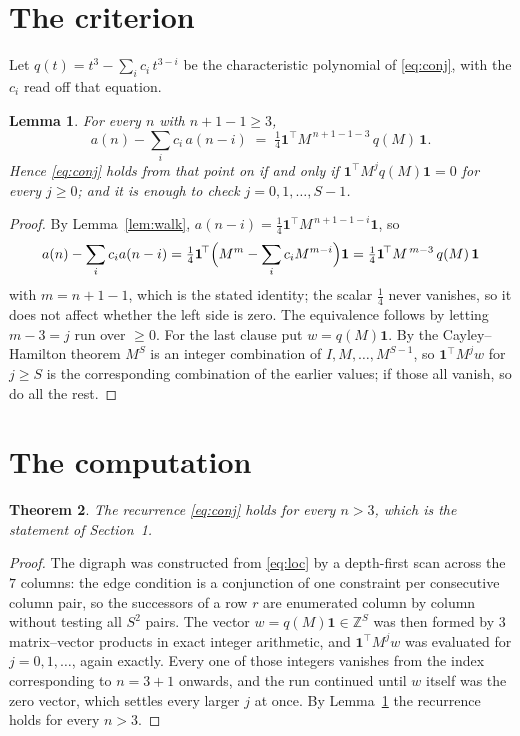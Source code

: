 \documentclass[11pt,a4paper]{article}
\theoremstyle{plain}
\newtheorem{theorem}{Theorem}
\newtheorem{lemma}[theorem]{Lemma}
\theoremstyle{definition}
\begin{document}
\section{The criterion}

Let $q(t)=t^{3}-\sum_i c_i\,t^{3-i}$ be the characteristic polynomial of
\eqref{eq:conj}, with the $c_i$ read off that equation.

\begin{lemma}\label{lem:crit}
For every $n$ with $n+1-1\ge3$,
\[
a(n)-\sum_i c_i\,a(n-i)\;=\;\tfrac1{4}\mathbf{1}^{\!\top}M^{\,n+1-1-3}\,q(M)\,\mathbf{1} .
\]
Hence \eqref{eq:conj} holds from that point on if and only if
$\mathbf{1}^{\!\top}M^{j}q(M)\mathbf{1}=0$ for every $j\ge0$; and it is enough to check
$j=0,1,\dots,S-1$.
\end{lemma}

\begin{proof}
By Lemma~\ref{lem:walk}, $a(n-i)=\tfrac1{4}\mathbf{1}^{\!\top}M^{\,n+1-1-i}\mathbf{1}$, so
\[
a(n)-\sum_i c_i a(n-i)
=\tfrac1{4}\mathbf{1}^{\!\top}\Bigl(M^{m}-\sum_i c_i M^{m-i}\Bigr)\mathbf{1}
=\tfrac1{4}\mathbf{1}^{\!\top}M^{\,m-3}\,q(M)\,\mathbf{1}
\]
with $m=n+1-1$, which is the stated identity; the scalar $\tfrac1{4}$ never vanishes, so
it does not affect whether the left side is zero. The equivalence follows by letting
$m-3=j$ run over $\ge0$. For the last clause put $w=q(M)\mathbf{1}$. By the
Cayley--Hamilton theorem $M^{S}$ is an integer combination of $I,M,\dots,M^{S-1}$, so
$\mathbf{1}^{\!\top}M^{j}w$ for $j\ge S$ is the corresponding combination of the earlier
values; if those all vanish, so do all the rest.
\end{proof}

\section{The computation}

\begin{theorem}
The recurrence \eqref{eq:conj} holds for every $n>3$, which is the statement of
Section~1.
\end{theorem}

\begin{proof}
The digraph was constructed from \eqref{eq:loc} by a depth-first scan across the $7$
columns: the edge condition is a conjunction of one constraint per consecutive column
pair, so the successors of a row $r$ are enumerated column by column without testing all
$S^2$ pairs. The vector $w=q(M)\mathbf{1}\in\mathbb{Z}^{S}$ was then formed by $3$
matrix--vector products in exact integer arithmetic, and $\mathbf{1}^{\!\top}M^{j}w$ was
evaluated for $j=0,1,\dots$, again exactly. Every one of those integers vanishes from the
index corresponding to $n=3+1$ onwards, and the run continued until $w$ itself was the
zero vector, which settles every larger $j$ at once. By Lemma~\ref{lem:crit} the recurrence
holds for every $n>3$.
\end{proof}
\end{document}

